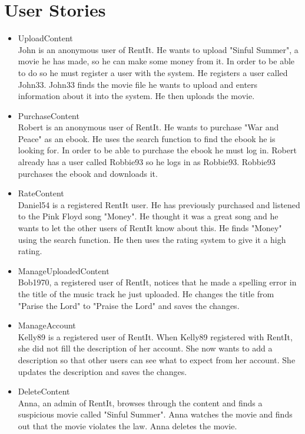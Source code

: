 \documentclass{article}
\begin{document}
\section{User Stories}
\begin{itemize}
\item UploadContent \\
John is an anonymous user of RentIt. He wants to upload "Sinful Summer", a movie he has made, so he can make some money from it. In order to be able to do so he must register a user with the system. He registers a user called John33. John33 finds the movie file he wants to upload and enters information about it into the system. He then uploads the movie.
\item PurchaseContent \\
Robert is an anonymous user of RentIt. He wants to purchase "War and Peace" as an ebook. He uses the search function to find the ebook he is looking for. In order to be able to purchase the ebook he must log in. Robert already has a user called Robbie93 so he logs in as Robbie93. Robbie93 purchases the ebook and downloads it.
\item RateContent \\
Daniel54 is a registered RentIt user. He has previously purchased and listened to the Pink Floyd song "Money". He thought it was a great song and he wants to let the other users of RentIt know about this. He finds "Money" using the search function. He then uses the rating system to give it a high rating.
\item ManageUploadedContent \\
Bob1970, a registered user of RentIt, notices that he made a spelling error in the title of the music track he just uploaded. He changes the title from "Parise the Lord" to "Praise the Lord" and saves the changes.
\item ManageAccount \\
Kelly89 is a registered user of RentIt. When Kelly89 registered with RentIt, she did not fill the description of her account. She now wants to add a description so that other users can see what to expect from her account. She updates the description and saves the changes.
\item DeleteContent \\
Anna, an admin of RentIt, browses through the content and finds a suspicious movie called "Sinful Summer". Anna watches the movie and finds out that the movie violates the law. Anna deletes the movie.
\end{itemize}
\end{document}
